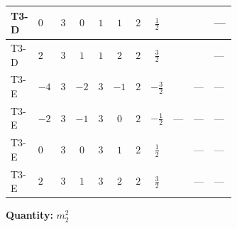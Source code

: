 \documentclass[8pt]{article}
\begin{document}
\begin{landscape}
\begin{longtable}{@{}llcccccc >{\raggedright\arraybackslash}p{0.21\linewidth} >{\raggedright\arraybackslash}p{0.21\linewidth} >{\raggedright\arraybackslash}p{0.21\linewidth}@{}}
\midrule
T3-D & $0$ & $3$ & $0$ & $1$ & $1$ & $2$ & $\frac{1}{2}$ & \scriptsize\adjustbox{max width=\linewidth}{$\begin{gathered} -6 {g_1}^2 {m_2^2}\end{gathered}$} & \scriptsize\adjustbox{max width=\linewidth}{$\begin{gathered} +6 {\lambda_{12}^{(1)}} {m_1^2}\end{gathered}$} & --- \\
\midrule
T3-D & $2$ & $3$ & $1$ & $1$ & $2$ & $2$ & $\frac{3}{2}$ & \scriptsize\adjustbox{max width=\linewidth}{$\begin{gathered} -24 {g_1}^2 {m_2^2}\end{gathered}$} & \scriptsize\adjustbox{max width=\linewidth}{$\begin{gathered} +6 {\lambda_{12}^{(1)}} {m_1^2}\end{gathered}$} & --- \\
\midrule
T3-E & $-4$ & $3$ & $-2$ & $3$ & $-1$ & $2$ & $-\frac{3}{2}$ & \scriptsize\adjustbox{max width=\linewidth}{$\begin{gathered} -6 {g_1}^2 {m_2^2}\end{gathered}$} & --- & --- \\
\midrule
T3-E & $-2$ & $3$ & $-1$ & $3$ & $0$ & $2$ & $-\frac{1}{2}$ & --- & --- & --- \\
\midrule
T3-E & $0$ & $3$ & $0$ & $3$ & $1$ & $2$ & $\frac{1}{2}$ & \scriptsize\adjustbox{max width=\linewidth}{$\begin{gathered} -6 {g_1}^2 {m_2^2}\end{gathered}$} & --- & --- \\
\midrule
T3-E & $2$ & $3$ & $1$ & $3$ & $2$ & $2$ & $\frac{3}{2}$ & \scriptsize\adjustbox{max width=\linewidth}{$\begin{gathered} -24 {g_1}^2 {m_2^2}\end{gathered}$} & --- & --- \\
\midrule
\bottomrule
\end{longtable}
\clearpage
\noindent\textbf{Quantity: }$m_2^2$\par\smallskip

\end{landscape}
\end{document}
